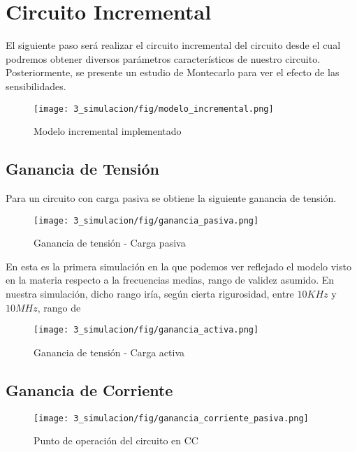 \section{Circuito Incremental}
El siguiente paso será realizar el circuito incremental del circuito desde el cual podremos obtener diversos parámetros 
característicos de nuestro circuito. Posteriormente, se presente un estudio de Montecarlo para ver el efecto de 
las sensibilidades.

\begin{figure}[H]
    \centering
    \texttt{[image: 3\_simulacion/fig/modelo\_incremental.png]}
    \label{mediciones_pol_activa}
    \caption{Modelo incremental implementado}
\end{figure}

\subsection{Ganancia de Tensión}

Para un circuito con carga pasiva se obtiene la siguiente ganancia de tensión.

\begin{figure}[H]
    \centering
    \texttt{[image: 3\_simulacion/fig/ganancia\_pasiva.png]}
    \label{mediciones_pol_activa}
    \caption{Ganancia de tensión -  Carga pasiva}
\end{figure}

En esta es la primera simulación en la que podemos ver reflejado el modelo visto en 
la materia respecto a la frecuencias medias, rango de validez asumido. En nuestra simulación,
dicho rango iría, según cierta rigurosidad, entre $10 KHz$ y $10 MHz$, rango de 

\begin{figure}[H]
    \centering
    \texttt{[image: 3\_simulacion/fig/ganancia\_activa.png]}
    \label{mediciones_pol_activa}
    \caption{Ganancia de tensión -  Carga activa}
\end{figure}

\subsection{Ganancia de Corriente}

\begin{figure}[H]
    \centering
    \texttt{[image: 3\_simulacion/fig/ganancia\_corriente\_pasiva.png]}
    \label{mediciones_pol_activa}
    \caption{Punto de operación del circuito en CC}
\end{figure}


